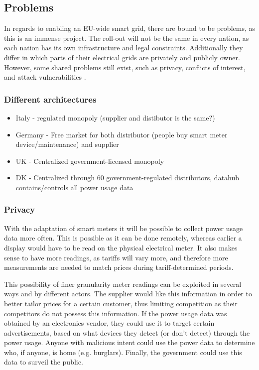\subsection{Problems}
In regards to enabling an EU-wide smart grid, there are bound to be problems, as this is an immense project.
The roll-out will not be the same in every nation, as each nation has its own infrastructure and legal constraints.
Additionally they differ in which parts of their electrical grids are privately and publicly owner.
However, some shared problems still exist, such as privacy, conflicts of interest, and attack vulnerabilities \cite{offswitch, smart_meter_survey, security_economics}.

\subsubsection{Different architectures}
\begin{itemize}
	\item Italy - regulated monopoly (supplier and distibutor is the same?)
	\item Germany - Free market for both distributor (people buy smart meter device/maintenance) and supplier
	\item UK - Centralized government-licensed monopoly
	\item DK - Centralized through 60 government-regulated distributors, datahub contains/controls all power usage data
\end{itemize}

\subsubsection{Privacy}
With the adaptation of smart meters it will be possible to collect power usage data more often.
This is possible as it can be done remotely, whereas earlier a display would have to be read on the physical electrical meter.
It also makes sense to have more readings, as tariffs will vary more, and therefore more measurements are needed to match prices during tariff-determined periods.

This possibility of finer granularity meter readings can be exploited in several ways and by different actors.
The supplier would like this information in order to better tailor prices for a certain customer, thus limiting competition as their competitors do not possess this information.
If the power usage data was obtained by an electronics vendor, they could use it to target certain advertisements, based on what devices they detect (or don't detect) through the power usage.
Anyone with malicious intent could use the power data to determine who, if anyone, is home (e.g. burglars).
Finally, the government could use this data to surveil the public.


